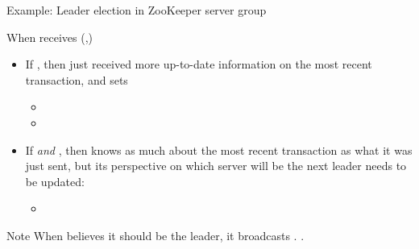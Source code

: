 \begin{frame}{Example: Leader election in ZooKeeper server group}
  \begin{block}{When  receives (,)}
    \begin{itemize}%

      \item If , then  just received more up-to-date
            information on the most recent transaction, and sets
            \begin{itemize}\firmlist
              \item {}
              \item {}
            \end{itemize}

      \item If  \emph{and} , then  knows as much about the most recent transaction as what it was just sent, but
            its perspective on which server will be the next leader needs to be updated:
            \begin{itemize}\firmlist
              \item {}
            \end{itemize}
    \end{itemize}
  \end{block}
  \begin{alertblock}{Note}
    When  believes it should be the leader, it broadcasts
    . .
  \end{alertblock}
\end{frame}
